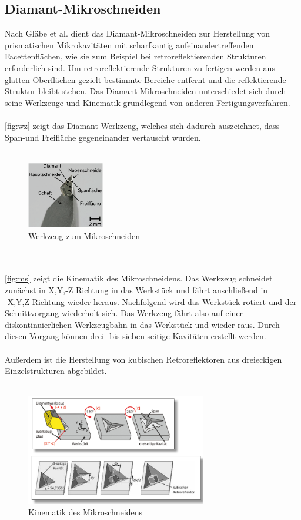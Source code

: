 \documentclass[12pt,a4paper,bibliography=totocnumbered,listof=totocnumbered]{scrartcl}
\begin{document}
\subsection{Diamant-Mikroschneiden}
Nach Gläbe et al. \cite{oberflaechen} dient das Diamant-Mikroschneiden zur Herstellung von prismatischen Mikrokavitäten mit scharfkantig aufeinandertreffenden Facettenflächen, wie sie zum Beispiel bei retroreflektierenden Strukturen erforderlich sind. Um retroreflektierende Strukturen zu fertigen werden aus glatten Oberflächen gezielt bestimmte Bereiche entfernt und die reflektierende Struktur bleibt stehen. Das Diamant-Mikroschneiden unterschiedet sich durch seine Werkzeuge und Kinematik grundlegend von anderen Fertigungsverfahren. \\ \\
\autoref{fig:wz} zeigt das Diamant-Werkzeug, welches sich dadurch auszeichnet, dass Span-und Freifläche gegeneinander vertauscht wurden. \\ \\
\begin{figure}[htbp]
\centering 
\includegraphics[width=0.3\textwidth]{Werkzeug.PNG}
\caption {Werkzeug zum Mikroschneiden \cite{oberflaechen}}
\label{fig:wz}
\end{figure}
\pagebreak
\\ \\
\autoref{fig:ms} zeigt die Kinematik des Mikroschneidens. Das Werkzeug schneidet zunächst in X,Y,-Z Richtung in das Werkstück und fährt anschließend in \\-X,Y,Z Richtung wieder heraus. Nachfolgend wird das Werkstück rotiert und der Schnittvorgang wiederholt sich. Das Werkzeug fährt also auf einer diskontinuierlichen Werkzeugbahn in das Werkstück und wieder raus. Durch diesen Vorgang können drei- bis sieben-seitige Kavitäten erstellt werden. \\ \\
Außerdem ist die Herstellung von kubischen Retroreflektoren aus dreieckigen Einzelstrukturen abgebildet. \\ \\
\begin{figure}[htbp]
\centering 
\includegraphics[width=0.7\textwidth]{Mikroschneiden_Kinematik.PNG}
\caption{Kinematik des Mikroschneidens \cite{retro}}
\label{fig:ms}
\end{figure}
\end{document}
